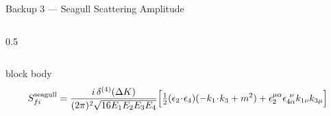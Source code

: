 \documentclass[aspectratio=169]{beamer}
\begin{document}
\begin{frame}[c]{Backup 3 — Seagull Scattering Amplitude}
\begin{columns}[T,totalwidth=\textwidth]
\begin{column}{0.5\textwidth}
\end{column}
\end{columns}

\vspace{0.0cm}

\begin{beamercolorbox}[rounded=true,sep=4pt,wd=\linewidth]{block body}
\footnotesize
\[
S_{fi}^{\rm seagull}
=
\frac{i\,\delta^{(4)}(\Delta K)}{(2\pi)^2\sqrt{16E_1E_2E_3E_4}}
\Big[
\tfrac12(\epsilon_2\!\cdot\!\epsilon_4)(-k_1\!\cdot\!k_3+m^2)
+\epsilon_{2}^{\mu\alpha}\epsilon_{4\alpha}^{\ \nu}k_{1\nu}k_{3\mu}
\Big]
\]
\end{beamercolorbox}

\end{frame}

\end{document}
